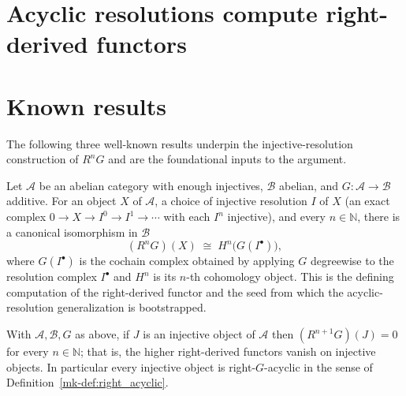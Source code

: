 \section{Acyclic resolutions compute right-derived functors}
\label{mk-chap:Cohomology_AcyclicResolution}

\section{Known results}

The following three well-known results underpin the injective-resolution
construction of \(R^n G\) and are the foundational inputs to the argument.

\begin{lemma}
  \label{mk-lem:right_derived_injective_resolution}
  \mathlibok

  Let \(\mathcal{A}\) be an abelian category with enough injectives,
  \(\mathcal{B}\) abelian, and \(G : \mathcal{A} \to \mathcal{B}\) additive. For an
  object \(X\) of \(\mathcal{A}\), a choice of injective resolution
  \(I\) of \(X\) (an exact complex \(0 \to X \to I^0 \to I^1 \to \cdots\) with each
  \(I^n\) injective), and every \(n \in \mathbb{N}\), there is a canonical
  isomorphism in \(\mathcal{B}\)
  \[
    (R^n G)(X)
      \;\cong\;
      H^n\bigl(G(I^\bullet)\bigr),
  \]
  where \(G(I^\bullet)\) is the cochain complex obtained by applying \(G\)
  degreewise to the resolution complex \(I^\bullet\) and \(H^n\) is its \(n\)-th
  cohomology object. This is the defining computation of the right-derived functor
  and the seed from which the acyclic-resolution generalization is bootstrapped.
\end{lemma}

\begin{lemma}
  \label{mk-lem:right_derived_vanishes_injective}
  \mathlibok

  With \(\mathcal{A}, \mathcal{B}, G\) as above, if \(J\) is an injective object of
  \(\mathcal{A}\) then \((R^{n+1} G)(J) = 0\) for every \(n \in \mathbb{N}\); that
  is, the higher right-derived functors vanish on injective objects. In particular
  every injective object is right-\(G\)-acyclic in the sense of
  Definition~\ref{mk-def:right_acyclic}.
\end{lemma}


